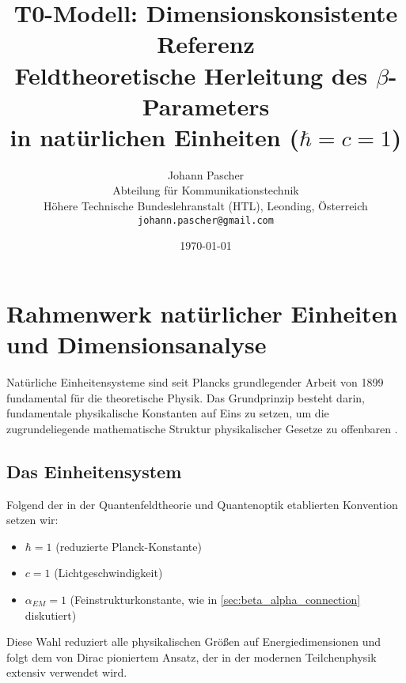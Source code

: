 \documentclass[12pt,a4paper]{article}
\begin{document}
	
	\title{T0-Modell: Dimensionskonsistente Referenz \\
		Feldtheoretische Herleitung des $\beta$-Parameters \\
		in natürlichen Einheiten ($\hbar = c = 1$)}
	\author{Johann Pascher\\
		Abteilung für Kommunikationstechnik\\
		Höhere Technische Bundeslehranstalt (HTL), Leonding, Österreich\\
		\texttt{johann.pascher@gmail.com}}
	\date{\today}
	
	\maketitle
	\tableofcontents
	\newpage
	
	\section{Rahmenwerk natürlicher Einheiten und Dimensionsanalyse}
	\label{sec:natural_units}
	
	Natürliche Einheitensysteme sind seit Plancks grundlegender Arbeit von 1899 \citep{planck1900,planck1906} fundamental für die theoretische Physik. Das Grundprinzip besteht darin, fundamentale physikalische Konstanten auf Eins zu setzen, um die zugrundeliegende mathematische Struktur physikalischer Gesetze zu offenbaren \citep{weinberg1995,peskin1995}.
	
	\subsection{Das Einheitensystem}
	\label{subsec:unit_system}
	
	Folgend der in der Quantenfeldtheorie \citep{peskin1995,weinberg1995} und Quantenoptik \citep{scully1997} etablierten Konvention setzen wir:
	\begin{itemize}
		\item $\hbar = 1$ (reduzierte Planck-Konstante)
		\item $c = 1$ (Lichtgeschwindigkeit)
		\item $\alpha_{EM} = 1$ (Feinstrukturkonstante, wie in \cref{sec:beta_alpha_connection} diskutiert)
	\end{itemize}
	
	Diese Wahl reduziert alle physikalischen Größen auf Energiedimensionen und folgt dem von Dirac \citep{dirac1958} pioniertem Ansatz, der in der modernen Teilchenphysik \citep{griffiths2008} extensiv verwendet wird.
	
\end{document}
